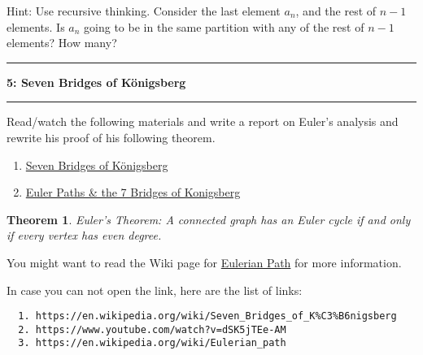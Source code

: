 \documentclass[11pt]{article}
\newcommand\question[2]{\vspace{.25in}\hrule\textbf{#1: #2}\vspace{.5em}\hrule\vspace{.10in}}
\newtheorem{theorem}{Theorem}
\begin{document}
Hint: Use recursive thinking. Consider the last element $a_n$, and the rest of $n-1$ elements. Is $a_n$ going to be in the same partition with any of the rest of $n-1$ elements? How many?
\question{5}{Seven Bridges of K\"onigsberg}

 Read/watch the following materials and write a report on Euler's analysis and rewrite his proof of his following theorem.
 \begin{enumerate}
   \item \href{https://en.wikipedia.org/wiki/Seven_Bridges_of_K%C3%B6nigsberg}{Seven Bridges of K\"onigsberg}
   \item \href{https://www.youtube.com/watch?v=dSK5jTEe-AM}{Euler Paths \& the 7 Bridges of Konigsberg }
 \end{enumerate}

 \begin{theorem}{Euler's Theorem:}
    A connected graph has an Euler cycle if and only if every vertex has even degree.
 \end{theorem}

 You might want to read the Wiki page for \href{https://en.wikipedia.org/wiki/Eulerian_path}{Eulerian Path} for more information.

 In case you can not open the link, here are the list of links:

 \begin{verbatim}
  1. https://en.wikipedia.org/wiki/Seven_Bridges_of_K%C3%B6nigsberg
  2. https://www.youtube.com/watch?v=dSK5jTEe-AM
  3. https://en.wikipedia.org/wiki/Eulerian_path
 \end{verbatim}
\end{document}
